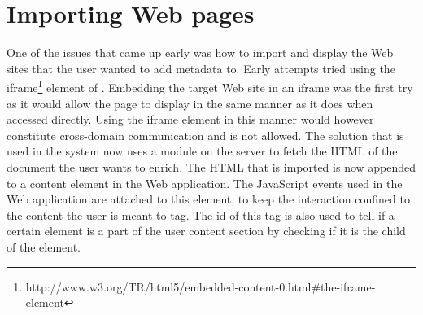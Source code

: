 \section{Importing Web pages}
One of the issues that came up early was how to import and display the Web sites that the user wanted to add metadata to.
Early attempts tried using the iframe\footnote{http://www.w3.org/TR/html5/embedded-content-0.html\#the-iframe-element}
element of .
Embedding the target Web site in an iframe was the first try as it would allow the page to display in the same manner
as it does when accessed directly.
Using the iframe element in this manner would however constitute cross-domain communication and is not allowed.
The solution that is used in the system now uses a module on the server to fetch the HTML of the document the user wants to enrich.
The HTML that is imported is now appended to a content element in the Web application.
The JavaScript events used in the Web application are attached to this element,
to keep the interaction confined to the content the user is meant to tag.
The id of this tag is also used to tell if a certain element is a part of the user content section by checking if it is
the child of the element.

